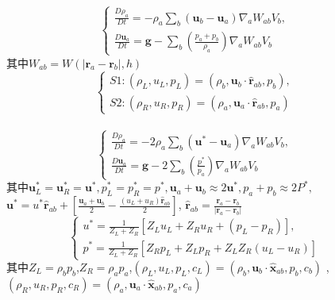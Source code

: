 \documentclass[UTF8]{ctexart}
\begin{document}
\begin{equation}
    \begin{cases} \frac{D \rho_a}{Dt}=-\rho_a\sum_{b}(\mathbf{u}_b - \mathbf{u}_a)\nabla_a W_{ab}V_b , \\
    \frac{D \mathbf{u}_a}{Dt}=\mathbf{g}-\sum_{b}(\frac{p_a+p_b}{\rho_a})\nabla_a W_{ab} V_b \end{cases} \qquad
\end{equation}
其中$W_{ab}=W(|\mathbf{r}_a-\mathbf{r}_b|,h)$\\

\begin{equation}
    \begin{cases} S1:(\rho_L,u_L,p_L)=(\rho_b,\mathbf{u}_b\cdot\hat{\mathbf{r}}_{ab},p_b), \\
    S2:(\rho_R,u_R,p_R)=(\rho_a,\mathbf{u}_a\cdot\hat{\mathbf{r}}_{ab},p_a) \end{cases} \qquad
\end{equation}\\

\begin{equation}
    \begin{cases} \frac{D \rho_a}{Dt}=-2\rho_a \sum_{b}(\mathbf{u}^*-\mathbf{u}_a)\nabla_a W_{ab} V_b, \\
    \frac{D \mathbf{u}_a}{Dt}=\mathbf{g}-2\sum_{b}(\frac{p^*}{p_a})\nabla_a W_{ab} V_b \end{cases} \qquad 
\end{equation}
其中$\mathbf{u}^*_L=\mathbf{u}^*_R=\mathbf{u}^*,p^*_L=p^*_R=p^*,\mathbf{u}_a+\mathbf{u}_b \approx 2\mathbf{u}^*,p_a+p_b\approx2P^*,$
$\mathbf{u}^*=u^*\hat{\mathbf{r}}_{ab}+[\frac{\mathbf{u}_a+\mathbf{u}_b}{2}-\frac{(u_L+u_R)\hat{\mathbf{r}}_{ab}}{2}]$,
$\hat{\mathbf{r}}_{ab}=\frac{\mathbf{r}_a-\mathbf{r}_b}{|\mathbf{r}_a-\mathbf{r}_b|}$\\

\begin{equation}
    \begin{cases} u^*=\frac{1}{Z_L+Z_R}[Z_L u_L + Z_R u_R +(p_L - p_R)], \\
    p^* = \frac{1}{Z_L + Z_R}[Z_R p_L + Z_L p_R + Z_L Z_R(u_L -u_R)] \end{cases} \qquad 
\end{equation}
其中$Z_L=\rho_b p_b$,$Z_R=\rho_a p_a$,$(\rho_L ,u_L ,p_L ,c_L)=(\rho_b ,\mathbf{u}_b\cdot\hat{\mathbf{x}}_{ab},p_b,c_b)$
,$(\rho_R,u_R,p_R,c_R)=(\rho_a,\mathbf{u}_a\cdot\hat{\mathbf{x}}_{ab},p_a,c_a)$\\
\end{document}
